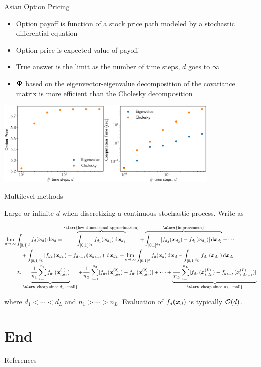 \documentclass[10pt,compress,xcolor={usenames,dvipsnames},aspectratio=169]{beamer}
\begin{document}
\begin{frame}{Asian Option Pricing}

	\vspace{-5ex}
	\begin{itemize}
		\item Option payoff is function of a stock price path modeled by a stochastic differential equation
		\item Option price is expected value of payoff
		\item True answer is the limit as the number of time steps, $d$ goes to $\infty$
		\item $\boldsymbol{\Psi}$ based on the eigenvector-eigenvalue decomposition of the covariance matrix is more efficient than the Cholesky decomposition
	\end{itemize}
	\centerline{\includegraphics[width=0.8\textwidth]{optionpricing.eps}}

\end{frame}

\begin{frame}{Multilevel methods}

	\vspace{-5ex}
	Large or infinite $d$ when discretizing a continuous stochastic process.  Write as

	\vspace{-5ex}
	\begin{align*}
		\MoveEqLeft{\lim_{d \to \infty} \int_{[0,1]^d} f_d(\vx_d) \, \dif \vx_d  =
		\overbrace{\int_{[0,1]^{d_1}} f_{d_1}(\vx_{d_1}) \, \dif \vx_{d_1}}^{\text{\alert{low dimensional approximation}}} +
		\overbrace{\int_{[0,1]^{d_2}} [f_{d_2}(\vx_{d_2}) - f_{d_1}(\vx_{d_1}) ]\, \dif \vx_{d_2}}^{\text{\alert{improvement}}} + \cdots }\\
		&
		\quad + \int_{[0,1]^{d_L}} [f_{d_L}(\vx_{d_L}) - f_{d_{L-1}}(\vx_{d_{L-1}}) ]\, \dif \vx_{d_L}
		+ \lim_{d \to \infty} \int_{[0,1]^d} f_d(\vx_d) \, \dif \vx_d -  \int_{[0,1]^{d_L}} f_{d_L}(\vx_{d_L}) \, \dif \vx_{d_L}\\
		& \approx \underbrace{\frac{1}{n_1} \sum_{i=1}^{n_1} f_{d_1}(\vx^{(1)}_{i,d_1})}_{\alert{\text{cheap since } d_1 \text{ small}}}
		+ \frac{1}{n_2} \sum_{i=1}^{n_2} [f_{d_2}(\vx^{(2)}_{i,d_2}) - f_{d_1}(\vx^{(2)}_{i,d_1}) ] + \cdots
		 + \underbrace{\frac{1}{n_L} \sum_{i=1}^{n_L} [f_{d_L}(\vx^{(L)}_{i,d_L}) - f_{d_{L-1}}(\vx^{(L)}_{i,d_{L-1}}) ]}_{\alert{\text{cheap since } n_L \text{ small}}}
	\end{align*}

	\vspace{-3ex}
	where $d_1 < \cdots < d_L$ and $n_1 > \cdots > n_L$.  Evaluation of $f_d(\boldsymbol{x}_d)$ is typically $\operatorname{{\mathcal O}}(d)$.


\end{frame}

\section{End}

\begin{frame}[allowframebreaks]{References}
	\printbibliography
\end{frame}
\end{document}
